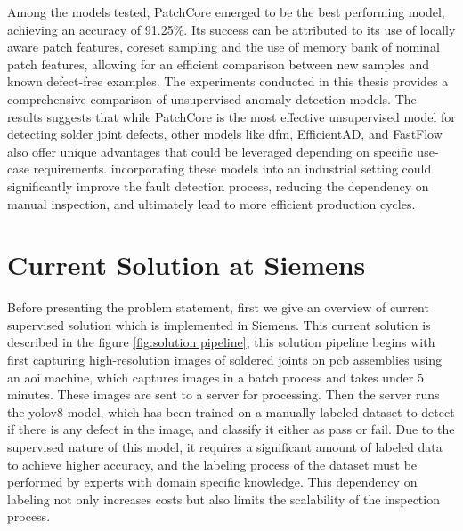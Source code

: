 Among the models tested, PatchCore emerged to be the best performing model, achieving an accuracy of 91.25\%. Its success can be attributed to its use of locally aware patch features, coreset sampling and the use of memory bank of nominal patch features, allowing for an efficient comparison between new samples and known defect-free examples. The experiments conducted in this thesis provides a comprehensive comparison of unsupervised anomaly detection models. The results suggests that while PatchCore is the most effective unsupervised model for detecting solder joint defects, other models like \gls{dfm}, EfficientAD, and FastFlow also offer unique advantages that could be leveraged depending on specific use-case requirements. incorporating these models into an industrial setting could significantly improve the fault detection process, reducing the dependency on manual inspection, and ultimately lead to more efficient production cycles.

\section{Current Solution at Siemens}
\label{subsec:current solution at siemens}

Before presenting the problem statement, first we give an overview of current supervised solution which is implemented in Siemens. This current solution is described in the figure \ref{fig:solution pipeline}, this solution pipeline begins with first capturing high-resolution images of soldered joints on \gls{pcb} assemblies using an \gls{aoi} machine, which captures images in a batch process and takes under 5 minutes. These images are sent to a server for processing. Then the server runs the \gls{yolo}v8 model, which has been trained on a manually labeled dataset to detect if there is any defect in the image, and classify it either as pass or fail. Due to the supervised nature of this model, it requires a significant amount of labeled data to achieve higher accuracy, and the labeling process of the dataset must be performed by experts with domain specific knowledge. This dependency on labeling not only increases costs but also limits the scalability of the inspection process.

